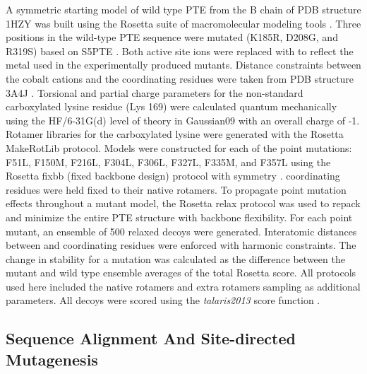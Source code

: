 \begin{refsection}
A symmetric starting model of wild type PTE from the B chain of PDB structure
1HZY \cite{Benning2001a} was built using the Rosetta suite of macromolecular
modeling tools \cite{Leaver-Fay2011,Leaver-Fay2013a,Song2011,Shapovalov2011}.
Three positions in the wild-type PTE sequence were mutated (K185R, D208G, and
R319S) based on S5PTE \cite{Roodveldt2005}. Both active site  ions
were replaced with  to reflect the metal used in the experimentally
produced mutants.  Distance constraints between the cobalt cations and the
coordinating residues were taken from PDB structure 3A4J \cite{Jackson2009b}.
Torsional and partial charge parameters for the non-standard carboxylated
lysine residue (Lys 169) were calculated quantum mechanically using the
HF/6-31G(d) level of theory in Gaussian09 \cite{Frisch2009a} with an overall
charge of -1.  Rotamer libraries for the carboxylated lysine were generated
with the Rosetta MakeRotLib \cite{Renfrew2012b} protocol.  Models were
constructed for each of the point mutations: F51L, F150M, F216L, F304L, F306L,
F327L, F335M, and F357L using the Rosetta fixbb (fixed backbone design)
protocol with symmetry \cite{DiMaio2011a}.  coordinating residues
were held fixed to their native rotamers. To propagate point mutation effects
throughout a mutant model, the Rosetta relax protocol was used to repack and
minimize the entire PTE structure with backbone flexibility. For each point
mutant, an ensemble of 500 relaxed decoys were generated. Interatomic distances
between  and coordinating residues were enforced with harmonic
constraints.  The change in stability for a mutation was calculated as the
difference between the mutant and wild type ensemble averages of the total
Rosetta score. All protocols used here included the native rotamers and extra
rotamers sampling as additional parameters. All decoys were scored using the
\emph{talaris2013} score function \cite{Leaver-Fay2013a}.

\subsection{Sequence Alignment And Site-directed Mutagenesis}


\end{refsection}
